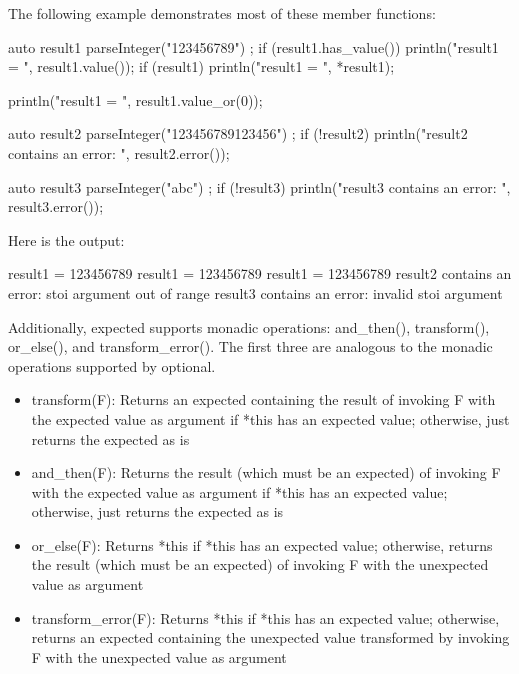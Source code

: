 The following example demonstrates most of these member functions:

\begin{cpp}
auto result1 { parseInteger("123456789") };
if (result1.has_value()) { println("result1 = {}", result1.value()); }
if (result1) { println("result1 = {}", *result1); }

println("result1 = {}", result1.value_or(0));

auto result2 { parseInteger("123456789123456") };
if (!result2) { println("result2 contains an error: {}", result2.error()); }

auto result3 { parseInteger("abc") };
if (!result3) { println("result3 contains an error: {}", result3.error()); }
\end{cpp}

Here is the output:

\begin{shell}
result1 = 123456789
result1 = 123456789
result1 = 123456789
result2 contains an error: stoi argument out of range
result3 contains an error: invalid stoi argument
\end{shell}

Additionally, expected supports monadic operations: and\_then(), transform(), or\_else(), and transform\_error(). The first three are analogous to the monadic operations supported by optional.

\begin{itemize}
\item
transform(F): Returns an expected containing the result of invoking F with the expected value as argument if *this has an expected value; otherwise, just returns the expected as is

\item
and\_then(F): Returns the result (which must be an expected) of invoking F with the expected value as argument if *this has an expected value; otherwise, just returns the expected as is

\item
or\_else(F): Returns *this if *this has an expected value; otherwise, returns the result (which must be an expected) of invoking F with the unexpected value as argument

\item
transform\_error(F): Returns *this if *this has an expected value; otherwise, returns an expected containing the unexpected value transformed by invoking F with the unexpected value as argument
\end{itemize}

